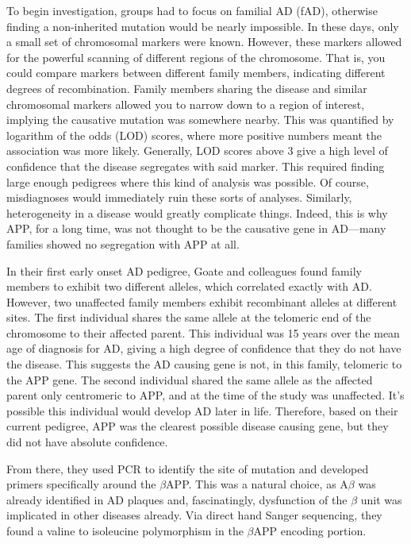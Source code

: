 To begin investigation, groups had to focus on familial AD (fAD), otherwise finding a non-inherited mutation would be nearly impossible. In these days, only a small set of chromosomal markers were known. However, these markers allowed for the powerful scanning of different regions of the chromosome. That is, you could compare markers between different family members, indicating different degrees of recombination. Family members sharing the disease and similar chromosomal markers allowed you to narrow down to a region of interest, implying the causative mutation was somewhere nearby. This was quantified by logarithm of the odds (LOD) scores, where more positive numbers meant the association was more likely. Generally, LOD scores above 3 give a high level of confidence that the disease segregates with said marker. This required finding large enough pedigrees where this kind of analysis was possible. Of course, misdiagnoses would immediately ruin these sorts of analyses. Similarly, heterogeneity in a disease would greatly complicate things. Indeed, this is why APP, for a long time, was not thought to be the causative gene in AD---many families showed no segregation with APP at all. \newline

In their first early onset AD pedigree, Goate and colleagues found family members to exhibit two different alleles, which correlated exactly with AD. However, two unaffected family members exhibit recombinant alleles at different sites. The first individual shares the same allele at the telomeric end of the chromosome to their affected parent. This individual was 15 years over the mean age of diagnosis for AD, giving a high degree of confidence that they do not have the disease. This suggests the AD causing gene is not, in this family, telomeric to the APP gene. The second individual shared the same allele as the affected parent only centromeric to APP, and at the time of the study was unaffected. It's possible this individual would develop AD later in life. Therefore, based on their current pedigree, APP was the clearest possible disease causing gene, but they did not have absolute confidence.\newline

From there, they used PCR to identify the site of mutation and developed primers specifically around the $\beta$APP. This was a natural choice, as A$\beta$ was already identified in AD plaques and, fascinatingly, dysfunction of the $\beta$ unit was implicated in other diseases already. Via direct hand Sanger sequencing, they found a valine to isoleucine polymorphism in the $\beta$APP encoding portion. \newline


